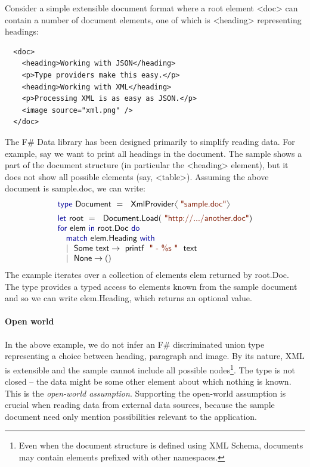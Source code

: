 \documentclass[10pt,preprint,blind,clearpagebib]{sigplanconf}
\newcommand{\langl}{\begin{picture}(4.5,7)
\put(1.1,2.5){\rotatebox{60}{\line(1,0){5.5}}}
\put(1.1,2.5){\rotatebox{300}{\line(1,0){5.5}}}
\end{picture}}
\newcommand{\rangl}{\begin{picture}(4.5,7)
\put(.9,2.5){\rotatebox{120}{\line(1,0){5.5}}}
\put(.9,2.5){\rotatebox{240}{\line(1,0){5.5}}}
\end{picture}}
\newcommand{\kvd}[1]{\textnormal{\textcolor{kvdclr}{\sffamily #1}}}
\newcommand{\str}[1]{\textnormal{\textcolor{strclr}{\sffamily "#1"}}}
\newcommand{\strf}[1]{\textnormal{\textcolor{strclr}{\sffamily #1}}}
\newcommand{\ident}[1]{\textnormal{\sffamily #1}}
\begin{document}
Consider a simple extensible document format where a root element
{\ttfamily\small <doc>} can contain a number of document elements, one of which is
{\ttfamily\small <heading>} representing headings:
%
{\small{
\begin{verbatim}
  <doc>
    <heading>Working with JSON</heading>
    <p>Type providers make this easy.</p>
    <heading>Working with XML</heading>
    <p>Processing XML is as easy as JSON.</p>
    <image source="xml.png" />
  </doc>
\end{verbatim}
}}
%
\noindent
The F\# Data library has been designed primarily to simplify reading data. For example,
say we want to print all headings in the document. The sample shows a part of the document structure 
(in particular the {\ttfamily\small <heading>} element), but it does not show all possible elements 
(say, {\ttfamily\small <table>}). Assuming the above document is \strf{sample.doc}, we can write:
%
\noindent
\begin{equation*}
\begin{array}{l}
 \kvd{type}~\ident{Document}~=~\ident{XmlProvider}\langl\str{sample.doc}\rangl\hspace{1em} \\[0.5em]
 \kvd{let}~\ident{root}~=~\ident{Document.Load}(\str{http://.../another.doc})\\
 \kvd{for}~\ident{elem}~\kvd{in}~\ident{root.Doc}~\kvd{do}\\
 \quad\kvd{match}~\ident{elem.Heading}~\kvd{with} \\
 \quad|~\ident{Some text} \rightarrow \ident{printf}~\str{ - \%s }~\ident{text}\\
 \quad|~\ident{None} \rightarrow ()\\
\end{array}
\end{equation*}
%
The example iterates over a collection of elements \ident{elem} returned by \ident{root.Doc}. 
The type provides a typed access to elements known from the sample document and so we can
write \ident{elem.Heading}, which returns an optional value.

\paragraph{Open world}

In the above example, we do not infer an F\# discriminated union type representing a choice between 
heading, paragraph and image. By its nature, XML is extensible and the sample cannot include all 
possible nodes\footnote{Even when the document structure is defined using XML Schema, documents may 
contain elements prefixed with other namespaces.}. 
The type is not closed -- the data might be some other element about which nothing is known.
This is the \emph{open-world assumption}. Supporting the open-world assumption is crucial when reading data from 
external data sources, because the sample document need only
mention possibilities relevant to the application. 
\end{document}
